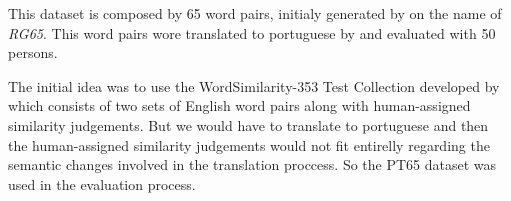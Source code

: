 This dataset is composed by 65 word pairs, initialy generated by  on the name of \textit{RG65}. This word pairs wore translated to portuguese by  and evaluated with 50 persons. 

The initial idea was to use the WordSimilarity-353 Test Collection developed by  which consists of two sets of English word pairs along with human-assigned similarity judgements. But we would have to translate to portuguese and then the human-assigned similarity judgements would not fit entirelly regarding the semantic changes involved in the translation proccess. So the PT65 dataset was used in the evaluation process.

























